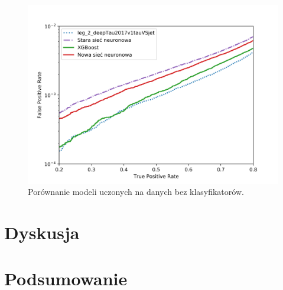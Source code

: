 \documentclass{pracalicmgr}
\begin{document}
	\begin{figure}
	\centering
	\includegraphics[width=1.\textwidth]{without_disc.png}
	\caption{Porównanie modeli uczonych na danych bez klasyfikatorów.}
	\label{fig:res_disc}
	\end{figure} 
	
    
    \chapter{Dyskusja}
    \chapter{Podsumowanie}
    
    \printbibliography
    
\end{document}
